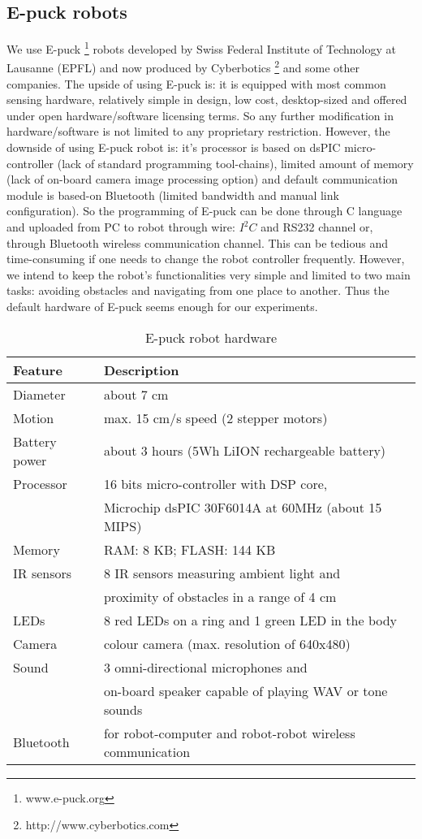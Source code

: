 \subsection{E-puck robots}
We use E-puck \footnote{www.e-puck.org} robots developed by Swiss Federal Institute of Technology at Lausanne (EPFL) and now produced by Cyberbotics \footnote{http://www.cyberbotics.com} and some other companies. The upside of using E-puck is: it is equipped with most common sensing hardware, relatively simple in design, low cost, desktop-sized and offered under open hardware/software licensing terms. So any further modification in hardware/software is not limited to any proprietary restriction. However, the  downside of using E-puck robot  is:  it's  processor is based on dsPIC micro-controller (lack of standard programming tool-chains), limited amount of memory (lack of on-board camera image processing option) and default  communication module is based-on Bluetooth (limited bandwidth and manual link configuration). So the programming of E-puck can be done through C language and uploaded from PC to robot through wire: $I^{2}C$ and RS232 channel or, through Bluetooth wireless communication channel. This can be tedious and time-consuming if  one needs to change the robot controller frequently. However, we intend to keep the robot's functionalities very simple and limited to two main tasks: avoiding obstacles and navigating from one place to another. Thus the default hardware of E-puck seems enough for our experiments. 

\begin{table}
\caption{E-puck robot hardware}
\label{table:epuck}
\begin{center}
\begin{tabular}{|l||l|}
\hline \textbf{Feature} & \textbf{Description}\\
\hline Diameter & about 7 cm\\
\hline Motion & max. 15 cm/s speed (2 stepper motors)\\
\hline Battery power & about 3 hours  (5Wh LiION rechargeable battery)\\
\hline Processor & 16 bits micro-controller with DSP core,\\ & Microchip dsPIC 30F6014A at 60MHz (about 15 MIPS)\\
\hline Memory & RAM: 8 KB; FLASH: 144 KB \\
\hline IR sensors & 8 IR sensors measuring ambient light and \\ &  proximity of obstacles in a range of 4 cm\\
\hline LEDs & 8 red LEDs on a ring and 1 green LED in the body \\
\hline Camera & colour camera (max. resolution of 640x480) \\
\hline Sound & 3 omni-directional microphones and\\  & on-board speaker capable of playing WAV or tone sounds\\
\hline Bluetooth & for robot-computer and robot-robot wireless communication\\
\hline
\end{tabular}
\end{center}
\end{table}

